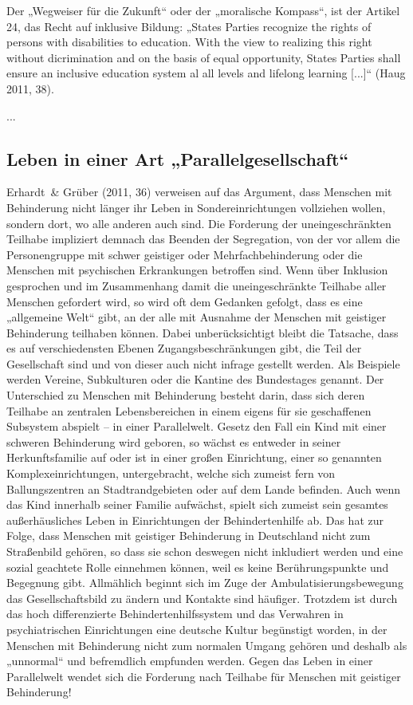 Der „Wegweiser für die Zukunft“ oder der „moralische Kompass“, ist der Artikel 24, das Recht auf inklusive Bildung: „States Parties recognize the rights of persons with disabilities to education. With the view to realizing this right without dicrimination and on the basis of equal opportunity, States Parties shall ensure an inclusive education system al all levels and lifelong learning [...]“ (Haug 2011, 38).

...

\subsection{Leben in einer Art „Parallelgesellschaft“}
Erhardt~\& Grüber (2011, 36) verweisen auf das Argument, dass Menschen mit Behinderung nicht länger ihr Leben in Sondereinrichtungen vollziehen wollen, sondern dort, wo alle anderen auch sind. Die Forderung der uneingeschränkten Teilhabe impliziert demnach das Beenden der Segregation, von der vor allem die Personengruppe mit schwer geistiger oder Mehrfachbehinderung oder die Menschen mit psychischen Erkrankungen betroffen sind. Wenn über Inklusion gesprochen und im Zusammenhang damit die uneingeschränkte Teilhabe aller Menschen gefordert wird, so wird oft dem Gedanken gefolgt, dass es eine „allgemeine Welt“ gibt, an der alle mit Ausnahme der Menschen mit geistiger Behinderung teilhaben können. Dabei unberücksichtigt bleibt die Tatsache, dass es auf verschiedensten Ebenen Zugangsbeschränkungen gibt, die Teil der Gesellschaft sind und von dieser auch nicht infrage gestellt werden. Als Beispiele werden Vereine, Subkulturen oder die Kantine des Bundestages genannt. Der Unterschied zu Menschen mit Behinderung besteht darin, dass sich deren Teilhabe an zentralen Lebensbereichen in einem eigens für sie geschaffenen Subsystem abspielt -- in einer Parallelwelt.
Gesetz den Fall ein Kind mit einer schweren Behinderung wird geboren, so wächst es entweder in seiner Herkunftsfamilie auf oder ist in einer großen Einrichtung, einer so genannten Komplexeinrichtungen, untergebracht, welche sich zumeist fern von Ballungszentren an Stadtrandgebieten oder auf dem Lande befinden. Auch wenn das Kind  innerhalb seiner Familie aufwächst, spielt sich zumeist sein gesamtes außerhäusliches Leben in Einrichtungen der Behindertenhilfe ab. Das hat zur Folge, dass Menschen mit geistiger Behinderung in Deutschland nicht zum Straßenbild gehören, so dass sie schon deswegen nicht inkludiert werden und eine sozial geachtete Rolle einnehmen können, weil es keine Berührungspunkte und Begegnung gibt. Allmählich beginnt sich im Zuge der Ambulatisierungsbewegung das Gesellschaftsbild zu ändern und Kontakte sind häufiger. Trotzdem ist durch das hoch differenzierte Behindertenhilfssystem und das Verwahren in psychiatrischen Einrichtungen eine deutsche Kultur begünstigt worden, in der Menschen mit Behinderung nicht zum normalen Umgang gehören und deshalb als „unnormal“ und befremdlich empfunden werden. Gegen das Leben in einer Parallelwelt wendet sich die Forderung nach Teilhabe für Menschen mit geistiger Behinderung! 
